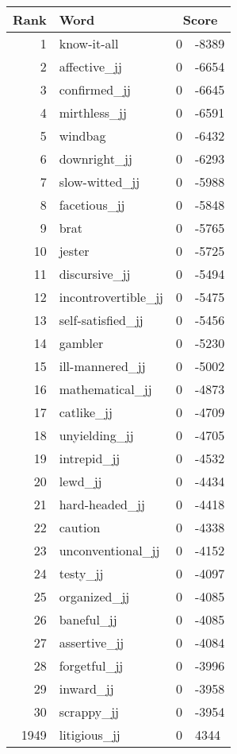 \begin{longtable}[!htbp]{| rlr@{.}l |}
    \hline
    \textbf{Rank} & \textbf{Word} & \multicolumn{2}{c|}{\textbf{Score}} \\
    \hline
    \endhead
    1 & know-it-all & 0 & -8389 \\
    2 & affective\_jj & 0 & -6654 \\
    3 & confirmed\_jj & 0 & -6645 \\
    4 & mirthless\_jj & 0 & -6591 \\
    5 & windbag & 0 & -6432 \\
    6 & downright\_jj & 0 & -6293 \\
    7 & slow-witted\_jj & 0 & -5988 \\
    8 & facetious\_jj & 0 & -5848 \\
    9 & brat & 0 & -5765 \\
    10 & jester & 0 & -5725 \\
    11 & discursive\_jj & 0 & -5494 \\
    12 & incontrovertible\_jj & 0 & -5475 \\
    13 & self-satisfied\_jj & 0 & -5456 \\
    14 & gambler & 0 & -5230 \\
    15 & ill-mannered\_jj & 0 & -5002 \\
    16 & mathematical\_jj & 0 & -4873 \\
    17 & catlike\_jj & 0 & -4709 \\
    18 & unyielding\_jj & 0 & -4705 \\
    19 & intrepid\_jj & 0 & -4532 \\
    20 & lewd\_jj & 0 & -4434 \\
    21 & hard-headed\_jj & 0 & -4418 \\
    22 & caution & 0 & -4338 \\
    23 & unconventional\_jj & 0 & -4152 \\
    24 & testy\_jj & 0 & -4097 \\
    25 & organized\_jj & 0 & -4085 \\
    26 & baneful\_jj & 0 & -4085 \\
    27 & assertive\_jj & 0 & -4084 \\
    28 & forgetful\_jj & 0 & -3996 \\
    29 & inward\_jj & 0 & -3958 \\
    30 & scrappy\_jj & 0 & -3954 \\
    1949 & litigious\_jj & 0 & 4344 \\

\end{longtable}
